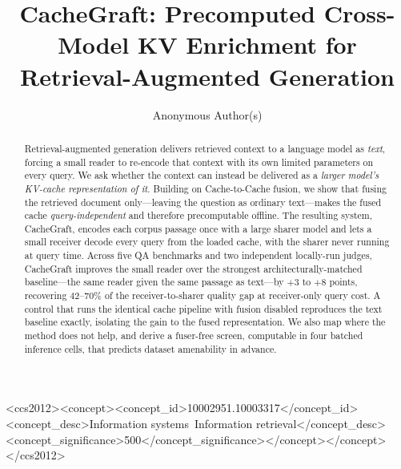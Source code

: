 \documentclass[sigconf,anonymous,review]{acmart}
\newif\ifanon\anontrue
\newcommand{\sys}{CacheGraft}
\begin{document}
\title{\sys: Precomputed Cross-Model KV Enrichment for Retrieval-Augmented Generation}

\ifanon
\author{Anonymous Author(s)}
\else
\author{Vihan Lakshman}
\email{vihanlaks@gmail.com}
\affiliation{\institution{Independent}\country{}}
\fi

\begin{abstract}
Retrieval-augmented generation delivers retrieved context to a language model as \emph{text},
forcing a small reader to re-encode that context with its own limited parameters on every query.
We ask whether the context can instead be delivered as a \emph{larger model's KV-cache
representation of it}. Building on Cache-to-Cache fusion, we show that fusing the retrieved
document only---leaving the question as ordinary text---makes the fused cache
\emph{query-independent} and therefore precomputable offline. The resulting system, \sys{},
encodes each corpus passage once with a large sharer model and lets a small receiver decode every
query from the loaded cache, with the sharer never running at query time. Across five QA
benchmarks and two independent locally-run judges, \sys{} improves the small reader over the
strongest architecturally-matched baseline---the same reader given the same passage as
text---by $+3$ to $+8$ points, recovering $42$--$70\%$ of the receiver-to-sharer quality gap at
receiver-only query cost. A control that runs the identical cache pipeline with fusion disabled
reproduces the text baseline exactly, isolating the gain to the fused representation. We also
map where the method does not help, and derive a fuser-free screen, computable in four batched inference cells, that predicts
dataset amenability in advance.
\end{abstract}

\begin{CCSXML}
<ccs2012><concept><concept_id>10002951.10003317</concept_id>
<concept_desc>Information systems~Information retrieval</concept_desc>
<concept_significance>500</concept_significance></concept></concept>
</ccs2012>
\end{CCSXML}

\maketitle

\end{document}
